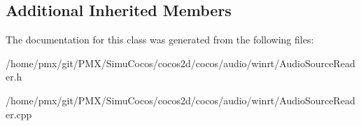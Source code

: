 \subsection*{Additional Inherited Members}


The documentation for this class was generated from the following files\+:\begin{DoxyCompactItemize}
\item 
/home/pmx/git/\+P\+M\+X/\+Simu\+Cocos/cocos2d/cocos/audio/winrt/Audio\+Source\+Reader.\+h\item 
/home/pmx/git/\+P\+M\+X/\+Simu\+Cocos/cocos2d/cocos/audio/winrt/Audio\+Source\+Reader.\+cpp\end{DoxyCompactItemize}
